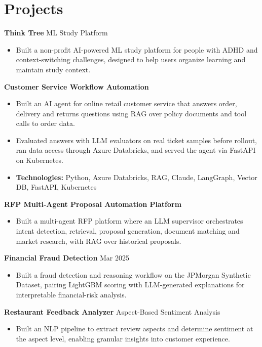 \documentclass[10pt,a4paper]{article}
\begin{document}
\section{Projects}
\textbf{Think Tree} \textbar{} ML Study Platform\par
\begin{itemize}
  \item Built a non-profit AI-powered ML study platform for people with ADHD and context-switching challenges, designed to help users organize learning and maintain study context.
\end{itemize}
\textbf{Customer Service Workflow Automation}\par
\begin{itemize}
  \item Built an AI agent for online retail customer service that answers order, delivery and returns questions using RAG over policy documents and tool calls to order data.
  \item Evaluated answers with LLM evaluators on real ticket samples before rollout, ran data access through Azure Databricks, and served the agent via FastAPI on Kubernetes.
  \item \textbf{Technologies:} Python, Azure Databricks, RAG, Claude, LangGraph, Vector DB, FastAPI, Kubernetes
\end{itemize}
\textbf{RFP Multi-Agent Proposal Automation Platform}\par
\begin{itemize}
  \item Built a multi-agent RFP platform where an LLM supervisor orchestrates intent detection, retrieval, proposal generation, document matching and market research, with RAG over historical proposals.
\end{itemize}
\textbf{Financial Fraud Detection} \textbar{} Mar 2025\par
\begin{itemize}
  \item Built a fraud detection and reasoning workflow on the JPMorgan Synthetic Dataset, pairing LightGBM scoring with LLM-generated explanations for interpretable financial-risk analysis.
\end{itemize}
\textbf{Restaurant Feedback Analyzer} \textbar{} Aspect-Based Sentiment Analysis\par
\begin{itemize}
  \item Built an NLP pipeline to extract review aspects and determine sentiment at the aspect level, enabling granular insights into customer experience.
\end{itemize}
\end{document}

